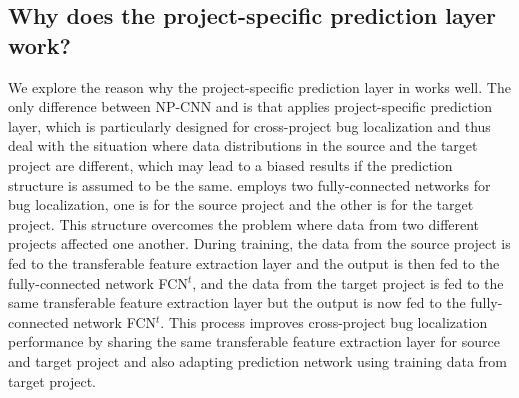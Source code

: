 \subsection{Why does the project-specific prediction layer work? }
We explore the reason why the project-specific prediction layer in \TRANPCNN works well. The only difference between NP-CNN and \TRANPCNN is that \TRANPCNN applies project-specific prediction layer, which is particularly designed for cross-project bug localization and thus deal with the situation where data distributions in the source and the target project are different, which may lead to a biased results if the prediction structure is assumed to be the same. \TRANPCNN employs two fully-connected networks for bug localization, one is for the source project and the other is for the target project. This structure overcomes the problem where data from two different projects affected one another. During training, the data from the source project is fed to the transferable feature extraction layer and the output is then fed to the fully-connected network FCN$^t$, and the data from the target project is fed to the same transferable feature extraction layer but the output is now fed to the fully-connected network FCN$^t$. This process improves cross-project bug localization performance by sharing the same transferable feature extraction layer for source and target project and also adapting prediction network using training data from target project. 

